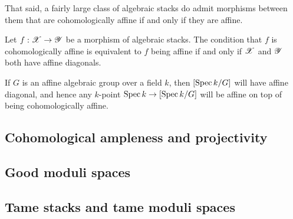         That said, a fairly large class of algebraic stacks do admit morphisms between them that are cohomologically affine if and only if they are affine.
        \begin{proposition}
            Let $f: \mathscr{X} \to \mathscr{Y}$ be a morphism of algebraic stacks. The condition that $f$ is cohomologically affine is equivalent to $f$ being affine if and only if $\mathscr{X}$ and $\mathscr{Y}$ both have affine diagonals.
        \end{proposition}
        \begin{example}
            If $G$ is an affine algebraic group over a field $k$, then $[\operatorname{Spec} k/G]$ will have affine diagonal, and hence any $k$-point $\operatorname{Spec} k \to [\operatorname{Spec} k/G]$ will be affine on top of being cohomologically affine.
        \end{example}

    \subsection{Cohomological ampleness and projectivity}

    \subsection{Good moduli spaces}

    \subsection{Tame stacks and tame moduli spaces}
